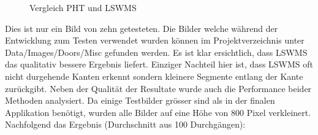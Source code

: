 \begin{figure}
\qquad
{}
\caption{Vergleich PHT und LSWMS}
\label{fig:comp-pht-lswms}
\end{figure}
\noindent
Dies ist nur ein Bild von zehn getesteten. Die Bilder welche während der Entwicklung zum Testen verwendet wurden können im Projektverzeichnis unter Data/Images/Doors/Misc gefunden werden. Es ist klar ersichtlich, dass LSWMS das qualitativ bessere Ergebnis liefert. Einziger Nachteil hier ist, dass LSWMS oft nicht durgehende Kanten erkennt sondern kleinere Segmente entlang der Kante zurückgibt. Neben der Qualität der Resultate wurde auch die Performance beider Methoden analysiert. Da einige Testbilder grösser sind als in der finalen Applikation benötigt, wurden alle Bilder auf eine Höhe von 800 Pixel verkleinert. Nachfolgend das Ergebnis (Durchschnitt aus 100 Durchgängen):

